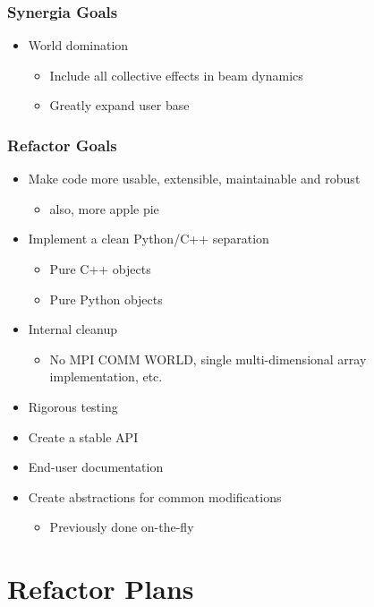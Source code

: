 \documentclass{beamer}
\begin{document}
\begin{frame}
 \frametitle{Synergia Goals}
  

\begin{itemize}
  \item World domination
\begin{itemize}
  \item Include all collective effects in beam dynamics
  \item Greatly expand user base
\end{itemize}
\end{itemize}

  
 \end{frame}
\begin{frame}
 \frametitle{Refactor Goals}
  

\begin{itemize}
  \item Make code more usable, extensible, maintainable and robust
\begin{itemize}
  \item also, more apple pie
\end{itemize}
  \item Implement a clean Python/C++ separation
\begin{itemize}
  \item Pure C++ objects
  \item Pure Python objects
\end{itemize}
  \item Internal cleanup
\begin{itemize}
  \item No MPI COMM WORLD, single multi-dimensional array implementation, etc.
\end{itemize}
  \item Rigorous testing
  \item Create a stable API
  \item End-user documentation
  \item Create abstractions for common modifications
\begin{itemize}
  \item Previously done on-the-fly
\end{itemize}
\end{itemize}

  
 \end{frame}

\section{Refactor Plans}
\end{document}
